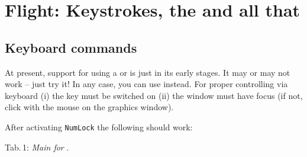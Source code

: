 
\chapter{Flight: Keystrokes, the   and all that\label{flight}}

\section{Keyboard commands}

At present, support for using a  or 
is just in its early stages. It may or may not work -- just try
it! In any case, you can use  instead.
For proper controlling via keyboard (i) the
\texttt{} key must be switched on (ii) the
\FlightGear window must have focus (if not, click with the mouse
on the graphics window).

After activating \texttt{NumLock} the following  should work:
\medskip

\noindent
 Tab.\,1: \textit{Main  for \FlightGear}.
\medskip


